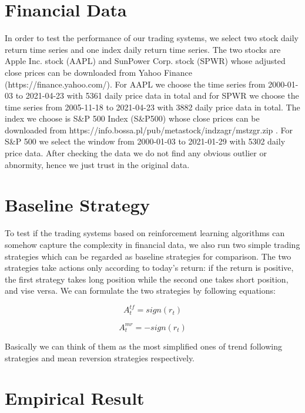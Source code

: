 \documentclass{article}
\begin{document}
\section{Financial Data} %

\noindent In order to test the performance of our trading systems, we select two stock daily return time series and one index daily return time series. The two stocks are Apple Inc. stock (AAPL) and SunPower Corp. stock (SPWR) whose adjusted close prices can be downloaded from Yahoo Finance (https://finance.yahoo.com/). For AAPL we choose the time series from 2000-01-03 to 2021-04-23 with 5361 daily price data in total and for SPWR we choose the time series from 2005-11-18 to 2021-04-23 with 3882 daily price data in total. The index we choose is S\&P 500 Index (S\&P500) whose close prices can be downloaded from https://info.bossa.pl/pub/metastock/indzagr/mstzgr.zip . For S\&P 500 we select the window from 2000-01-03 to 2021-01-29 with 5302 daily price data. After checking the data we do not find any obvious outlier or abnormity, hence we just trust in the original data.

\section{Baseline Strategy} %

\noindent To test if the trading systems based on reinforcement learning algorithms can somehow capture the complexity in financial data, we also run two simple trading strategies which can be regarded as baseline strategies for comparison. The two strategies take actions only according to today's return: if the return is positive, the first strategy takes long position while the second one takes short position, and vise versa. We can formulate the two strategies by following equations:

\begin{equation}
	A_{t}^{tf} = sign(r_{t})
\end{equation}

\begin{equation}
	A_{t}^{mr} = -sign(r_{t})
\end{equation}

\noindent Basically we can think of them as the most simplified ones of trend following strategies and mean reversion strategies respectively.

\section{Empirical Result} %
\end{document}
